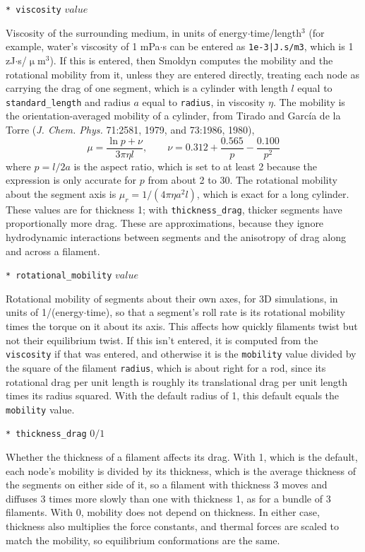 \documentclass {scrbook}
\newcommand {\ttt} {\texttt}
\begin{document}
\begin{description}
\item{\ttt{* viscosity} $value$}%

Viscosity of the surrounding medium, in units of energy$\cdot$time/length$^3$ (for example, water's viscosity of 1 mPa$\cdot$s can be entered as \ttt{1e-3|J.s/m3}, which is 1 zJ$\cdot$s/$\upmu$m$^3$). If this is entered, then Smoldyn computes the mobility and the rotational mobility from it, unless they are entered directly, treating each node as carrying the drag of one segment, which is a cylinder with length $l$ equal to \ttt{standard\_length} and radius $a$ equal to \ttt{radius}, in viscosity $\eta$. The mobility is the orientation-averaged mobility of a cylinder, from Tirado and Garc\'{i}a de la Torre (\textit{J. Chem. Phys.} 71:2581, 1979, and 73:1986, 1980),
$$\mu = \frac{\ln p + \nu}{3\pi\eta l}, \qquad \nu = 0.312+\frac{0.565}{p}-\frac{0.100}{p^2}$$
where $p=l/2a$ is the aspect ratio, which is set to at least 2 because the expression is only accurate for $p$ from about 2 to 30. The rotational mobility about the segment axis is $\mu_r = 1/(4\pi\eta a^2 l)$, which is exact for a long cylinder. These values are for thickness 1; with \ttt{thickness\_drag}, thicker segments have proportionally more drag. These are approximations, because they ignore hydrodynamic interactions between segments and the anisotropy of drag along and across a filament.

\item{\ttt{* rotational\_mobility} $value$}%

Rotational mobility of segments about their own axes, for 3D simulations, in units of 1/(energy$\cdot$time), so that a segment's roll rate is its rotational mobility times the torque on it about its axis. This affects how quickly filaments twist but not their equilibrium twist. If this isn't entered, it is computed from the \ttt{viscosity} if that was entered, and otherwise it is the \ttt{mobility} value divided by the square of the filament \ttt{radius}, which is about right for a rod, since its rotational drag per unit length is roughly its translational drag per unit length times its radius squared. With the default radius of 1, this default equals the \ttt{mobility} value.

\item{\ttt{* thickness\_drag} $0/1$}

Whether the thickness of a filament affects its drag. With 1, which is the default, each node's mobility is divided by its thickness, which is the average thickness of the segments on either side of it, so a filament with thickness 3 moves and diffuses 3 times more slowly than one with thickness 1, as for a bundle of 3 filaments. With 0, mobility does not depend on thickness. In either case, thickness also multiplies the force constants, and thermal forces are scaled to match the mobility, so equilibrium conformations are the same.


\end{description}
\end{document}
